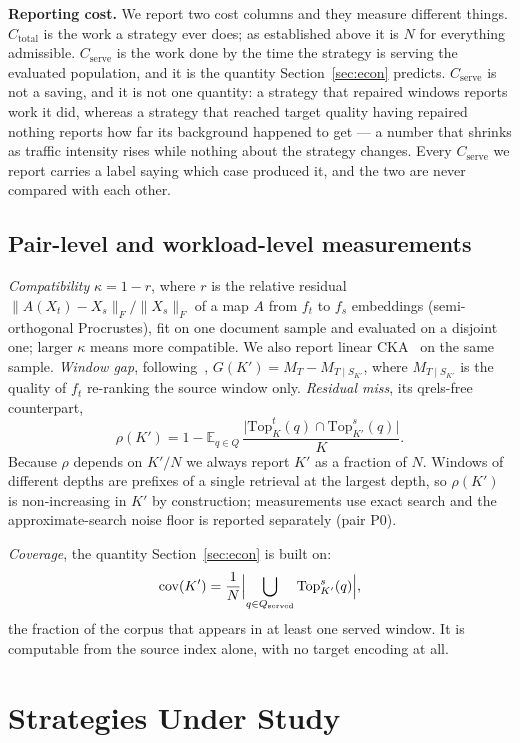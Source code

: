 \documentclass[conference]{IEEEtran}
\newcommand{\topk}{\mathrm{Top}}
\newcommand{\cov}{\mathrm{cov}}
\begin{document}
\textbf{Reporting cost.} We report two cost columns and they measure different things.
$C_{\text{total}}$ is the work a strategy ever does; as established above it is $N$ for
everything admissible. $C_{\text{serve}}$ is the work done by the time the strategy is
serving the evaluated population, and it is the quantity Section~\ref{sec:econ}
predicts. $C_{\text{serve}}$ is not a saving, and it is not one quantity: a strategy that
repaired windows reports work it did, whereas a strategy that reached target quality
having repaired nothing reports how far its background happened to get --- a number that
shrinks as traffic intensity rises while nothing about the strategy changes. Every
$C_{\text{serve}}$ we report carries a label saying which case produced it, and the two
are never compared with each other.

\subsection{Pair-level and workload-level measurements}
\emph{Compatibility} $\kappa = 1 - r$, where $r$ is the relative residual
$\lVert A(X_t) - X_s\rVert_F / \lVert X_s\rVert_F$ of a map $A$ from $f_t$ to $f_s$
embeddings (semi-orthogonal Procrustes), fit on one document sample and evaluated on a
disjoint one; larger $\kappa$ means more compatible. We also report linear
CKA~\cite{cka} on the same sample. \emph{Window gap}, following~\cite{embedflow},
$G(K') = M_T - M_{T\mid S_{K'}}$, where $M_{T\mid S_{K'}}$ is the quality of $f_t$
re-ranking the source window only. \emph{Residual miss}, its qrels-free counterpart,
\[
\rho(K') = 1 - \mathbb{E}_{q\in Q}\,
\frac{\lvert \topk_K^{t}(q) \cap \topk_{K'}^{s}(q)\rvert}{K}.
\]
Because $\rho$ depends on $K'/N$ we always report $K'$ as a fraction of $N$. Windows of
different depths are prefixes of a single retrieval at the largest depth, so $\rho(K')$
is non-increasing in $K'$ by construction; measurements use exact search and the
approximate-search noise floor is reported separately (pair P0).

\emph{Coverage}, the quantity Section~\ref{sec:econ} is built on:
\[
\cov(K') = \frac{1}{N}\Bigl\lvert \bigcup_{q \in Q_{\text{served}}} \topk_{K'}^{s}(q) \Bigr\rvert ,
\]
the fraction of the corpus that appears in at least one served window. It is computable
from the source index alone, with no target encoding at all.

\section{Strategies Under Study}\label{sec:strategies}
\end{document}
